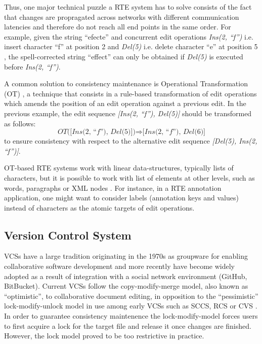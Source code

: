 \documentclass{sig-alternate}
\begin{document}
Thus, one major technical puzzle a RTE system has to solve consists of the fact that changes
are propragated across networks with different communication latencies and therefore do not
reach all end points in the same order. For example, given
the string ``efecte'' and concurrent edit operations \textit{Ins(2, ``f'')} \textemdash i.e.
insert character ``f'' at position 2 \textemdash and \textit{Del(5)} \textemdash i.e.
delete character ``e'' at position 5 \textemdash, the spell-corrected string ``effect''
can only be obtained if \textit{Del(5)} is executed before \textit{Ins(2, ``f'')}.

A common solution to consistency maintenance is Operational Transformation
(OT) \cite{SuClarence}, a technique that consists in a rule-based transformation
of edit operations which amends the position of an edit operation against a previous edit.
In the previous example, the edit sequence \textit{[Ins(2, ``f''), Del(5)]} should be
transformed as follows:
\begin{equation*}
  \textit{OT([Ins(2, ``f''), Del(5)])} \Rightarrow \textit{[Ins(2, ``f''), Del(6)]}
\end{equation*}
to ensure consistency with respect to the alternative edit sequence
\textit{[Del(5), Ins(2, ``f'')]}.


OT-based RTE systems work with linear data-structures, typically lists of characters, but it
is possible to work with list of elements at other levels, such as words, paragraphs or
XML nodes \cite{Imine2009,SuClarence}. For instance, in a RTE annotation application, one
might want to consider labels (annotation keys and values) instead of characters as the
atomic targets of edit operations.


\subsection{Version Control System}\label{subsec:vcs}

VCSs have a large tradition originating in the 1970s as groupware for enabling collaborative
software development and more recently have become widely adopted as a result of
integration with a social network environment (GitHub, BitBucket).
Current VCSs follow the copy-modify-merge model, also known as ``optimistic'', to
collaborative document editing, in opposition to the ``pessimistic'' lock-modify-unlock model
in use among early VCSs such as SCCS, RCS or CVS \cite{Loeliger2012}.
In order to guarantee consistency maintenence the lock-modify-model forces users to first
acquire a lock for the target file and release it once changes are finished. However, 
the lock model proved to be too restrictive in practice.
\end{document}

